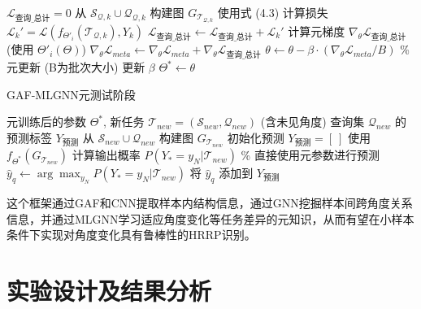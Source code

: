 \begin{algorithm}[htbp]
\begin{algorithmic}[1]
            \STATE $\mathcal{L}_{查询\_总计} = 0$
               \STATE 从 $\mathcal{S}_{\mathcal{Q},k} \cup \mathcal{Q}_{\mathcal{Q},k}$ 构建图 $G_{\mathcal{T}_{\mathcal{Q},k}}$
               \STATE 使用式 (4.3) 计算损失 $\mathcal{L}_k' = \mathcal{L}(f_{\Theta'_i}(\mathcal{T}_{\mathcal{Q},k}), Y_k)$
               \STATE $\mathcal{L}_{查询\_总计} \leftarrow \mathcal{L}_{查询\_总计} + \mathcal{L}_k'$
            \ENDFOR %
            \STATE 计算元梯度 $\nabla_\theta \mathcal{L}_{查询\_总计}$ (使用 $\Theta'_i(\Theta)$)
            \STATE $\nabla_\theta \mathcal{L}_{meta} \leftarrow \nabla_\theta \mathcal{L}_{meta} + \nabla_\theta \mathcal{L}_{查询\_总计}$
        \ENDFOR %
        \STATE $\theta \leftarrow \theta - \beta \cdot (\nabla_\theta \mathcal{L}_{meta} / B)$ \% 元更新 (B为批次大小)
        \STATE 更新 $\beta$ 
    \ENDWHILE %
    \STATE $\Theta^* \leftarrow \theta$
\end{algorithmic}
\end{algorithm}

\begin{algorithm}[htbp]
\caption{GAF-MLGNN元测试阶段}
\label{alg:meta_testing_angle}
\begin{algorithmic}[1]
    \REQUIRE 元训练后的参数 $\Theta^*$, 新任务 $\mathcal{T}_{new} = (\mathcal{S}_{new}, \mathcal{Q}_{new})$ (含未见角度)
    \ENSURE 查询集 $\mathcal{Q}_{new}$ 的预测标签 $Y_{预测}$
    \STATE 从 $\mathcal{S}_{new} \cup \mathcal{Q}_{new}$ 构建图 $G_{\mathcal{T}_{new}}$
    \STATE 初始化预测 $Y_{预测} = [~]$
        \STATE 使用 $f_{\Theta^*}(G_{\mathcal{T}_{new}})$ 计算输出概率 $P(Y_* = y_N | \mathcal{T}_{new})$ \% 直接使用元参数进行预测
        \STATE $\hat{y}_q \leftarrow \arg\max_{y_N} P(Y_* = y_N | \mathcal{T}_{new})$
        \STATE 将 $\hat{y}_q$ 添加到 $Y_{预测}$
    \ENDFOR %
\end{algorithmic}
\end{algorithm}
这个框架通过GAF和CNN提取样本内结构信息，通过GNN挖掘样本间跨角度关系信息，并通过MLGNN学习适应角度变化等任务差异的元知识，从而有望在小样本条件下实现对角度变化具有鲁棒性的HRRP识别。

\section{实验设计及结果分析}
\label{sec:experiments_angle}

